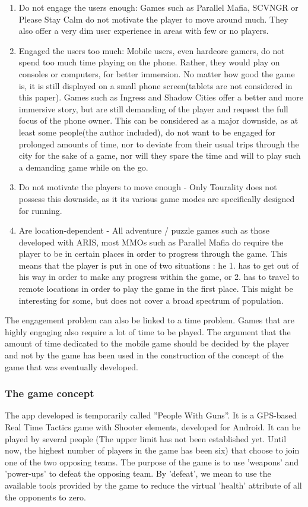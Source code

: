\begin{enumerate}
  \item Do not engage the users enough: Games such as Parallel Mafia, SCVNGR or
  Please Stay Calm do not motivate the player to move around much. They also
  offer a very dim user experience in areas with few or no players.
  \item Engaged the users too much: Mobile users, even hardcore gamers, do not
  spend too much time playing on the phone. Rather, they would play on consoles
  or computers, for better immersion. No matter how good the game is, it is
  still displayed on a small phone screen(tablets are not considered in this
  paper). Games such as Ingress and Shadow Cities offer a better and more
  immersive story, but are still demanding of the player and request the full
  focus of the phone owner. This can be considered as a major downside, as at
  least some people(the author included), do not want to be engaged for
  prolonged amounts of time, nor to deviate from their usual trips through
  the city for the sake of a game, nor will they spare the time and will to play
  such a demanding game while on the go.  
  \item Do not motivate the players to move enough - Only Tourality does not
  possess this downside, as it its various game modes are specifically designed
  for running.
  \item Are location-dependent - All adventure / puzzle games such as those
  developed with ARIS, most MMOs such as Parallel Mafia do require the player to
  be in certain places in order to progress through the game. This means that
  the player is put in one of two situations : he 1. has to get out of
  his way in order to make any progress within the game, or 2. has to travel
  to remote locations in order to play the game in the first place. This might
  be interesting for some, but does not cover a broad spectrum of population. 
\end{enumerate}

The engagement problem can also be linked to a time problem. Games that are
highly engaging also require a lot of time to be played. The argument that the
amount of time dedicated to the mobile game should be decided by the player and
not by the game has been used in the construction of the concept of the game
that was eventually developed. \newline

\subsubsection{The game concept}
The app developed is temporarily called ''People With Guns''. It is a GPS-based
Real Time Tactics game with Shooter elements, developed for Android. It can be
played by several people (The upper limit has not been established yet. Until
now, the highest number of players in the game has been six) that choose to join
one of the two opposing teams. The purpose of the game is to use 'weapons' and
'power-ups' to defeat the opposing team. By 'defeat', we mean to use the
available tools provided by the game to reduce the virtual 'health' attribute of
all the opponents to zero.\newline

